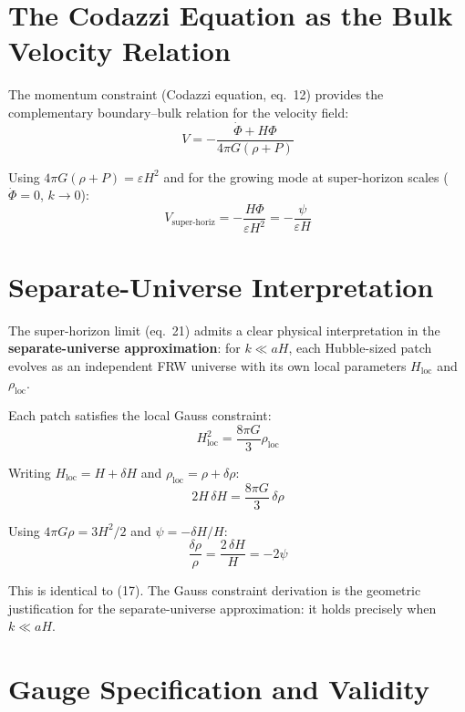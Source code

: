 \documentclass[12pt,a4paper]{article}
\begin{document}
\section{The Codazzi Equation as the Bulk Velocity Relation}

The momentum constraint (Codazzi equation, eq.~12) provides the complementary boundary--bulk relation for the velocity field:
\begin{equation}
V = -\frac{\dot\Phi + H\Phi}{4\pi G(\rho+P)} \tag{24}
\end{equation}

Using $4\pi G(\rho+P) = \varepsilon H^2$ and for the growing mode at super-horizon scales ($\dot\Phi = 0$, $k \to 0$):
\begin{equation}
V_\text{super-horiz} = -\frac{H\Phi}{\varepsilon H^2} = -\frac{\psi}{\varepsilon H} \tag{25}
\end{equation}

\section{Separate-Universe Interpretation}

The super-horizon limit (eq.~21) admits a clear physical interpretation in the \textbf{separate-universe approximation}: for $k \ll aH$, each Hubble-sized patch evolves as an independent FRW universe with its own local parameters $H_\text{loc}$ and $\rho_\text{loc}$.

Each patch satisfies the local Gauss constraint:
\begin{equation}
H_\text{loc}^2 = \frac{8\pi G}{3}\rho_\text{loc} \tag{26}
\end{equation}

Writing $H_\text{loc} = H + \delta H$ and $\rho_\text{loc} = \rho + \delta\rho$:
\begin{equation}
2H\,\delta H = \frac{8\pi G}{3}\,\delta\rho \tag{27}
\end{equation}

Using $4\pi G\rho = 3H^2/2$ and $\psi = -\delta H/H$:
\begin{equation}
\frac{\delta\rho}{\rho} = \frac{2\,\delta H}{H} = -2\psi \tag{28}
\end{equation}

This is identical to (17). The Gauss constraint derivation is the geometric justification for the separate-universe approximation: it holds precisely when $k \ll aH$.

\section{Gauge Specification and Validity}
\end{document}
